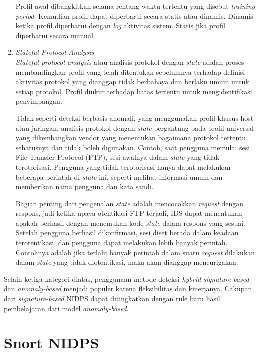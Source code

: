 \begin{enumerate}
      Profil awal dibangkitkan selama rentang waktu tertentu yang disebut \emph{training period}. Kemudian profil dapat diperbarui secara statis atau dinamis. Dinamis ketika profil diperbarui dengan \emph{log} aktivitas sistem. Statis jika profil diperbarui secara manual.

      \item
      \emph{Stateful Protocol Analysis} \\
      \emph{Stateful protocol analysis} atau analisis protokol dengan \emph{state} adalah proses membandingkan profil yang telah ditentukan sebelumnya terhadap definisi aktivitas protokol yang dianggap tidak berbahaya dan berlaku umum untuk setiap protokol. Profil diukur terhadap batas tertentu untuk mengidentifikasi penyimpangan. 

      Tidak seperti deteksi berbasis anomali, yang menggunakan profil khusus host atau jaringan, analisis protokol dengan \emph{state} bergantung pada profil universal yang dikembangkan vendor yang menentukan bagaimana protokol tertentu seharusnya dan tidak boleh digunakan. Contoh, saat pengguna memulai sesi File Transfer Protocol (FTP), sesi awalnya dalam \emph{state} yang tidak terotorisasi. Pengguna yang tidak terotorisasi hanya dapat melakukan beberapa perintah di \emph{state} ini, seperti melihat informasi umum dan memberikan nama pengguna dan kata sandi. 

      Bagian penting dari pengenalan \emph{state} adalah mencocokkan \emph{request} dengan respons, jadi ketika upaya otentikasi FTP terjadi, IDS dapat menentukan apakah berhasil dengan menemukan kode \emph{state} dalam respons yang sesuai. Setelah pengguna berhasil dikonfirmasi, sesi diset berada dalam keadaan terotentikasi, dan pengguna dapat melakukan lebih banyak perintah. Contohnya adalah jika terlalu banyak perintah dalam suatu \emph{request} dilakukan dalam \emph{state} yang tidak diotentikasi, maka akan dianggap mencurigakan. 

    \end{enumerate}

    Selain ketiga kategori diatas, penggunaan metode deteksi \emph{hybrid} \emph{signature-based} dan \emph{anomaly-based} menjadi populer karena fleksibilitas dan kinerjanya. Cakupan dari \emph{signature-based} NIDPS dapat ditingkatkan dengan rule baru hasil pembelajaran dari model \emph{anomaly-based}.

\section{Snort NIDPS}


